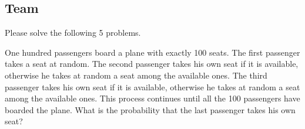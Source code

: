 \subsection{Team}
Please solve the following 5 problems.

\begin{exercise}\label{probability:2015:6}
One hundred passengers board a plane with exactly 100 seats. The first passenger takes a seat at random. The second passenger takes his own seat if it is available, otherwise he takes at random a seat among the available ones. The third passenger takes his own seat if it is available, otherwise he takes at random a seat among the available ones. This process continues until all the 100 passengers have boarded the plane. What is the probability that the last passenger takes his own seat?
\end{exercise}

